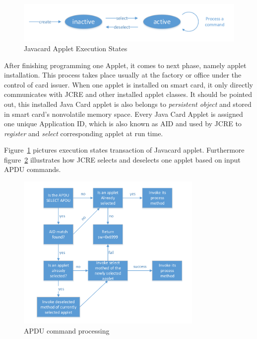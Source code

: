 \begin{figure}[!htbp]
	\centering
	\includegraphics[width=1\textwidth]{applet-execution-states}
		\caption{Javacard Applet Execution States\cite{handbuch}}
	\label{fig:applet-execution-states}
\end{figure}
After finishing programming one Applet, it comes to next phase, namely applet installation. This process takes place usually at the factory or office under the control of card issuer. When one applet is installed on smart card, it only directly communicates with JCRE and other installed applet classes. It should be pointed out, this installed Java Card applet is also belongs to \emph{persistent object} and stored in smart card's nonvolatile memory space. Every Java Card Applet is assigned one unique Application ID, which is also known as AID and used by JCRE to \emph{register} and \emph{select} corresponding applet at run time.

Figure~\ref{fig:applet-execution-states} pictures execution states transaction of Javacard applet. Furthermore figure~\ref{fig:apdu-command-processing} illustrates how JCRE selects and deselects one applet based on input APDU commands.

\begin{figure}[!htbp]
	\centering
	\includegraphics[width=0.8\textwidth]{apdu-command-processing}
		\caption{APDU command processing\cite{handbuch}}
	\label{fig:apdu-command-processing}
\end{figure}


